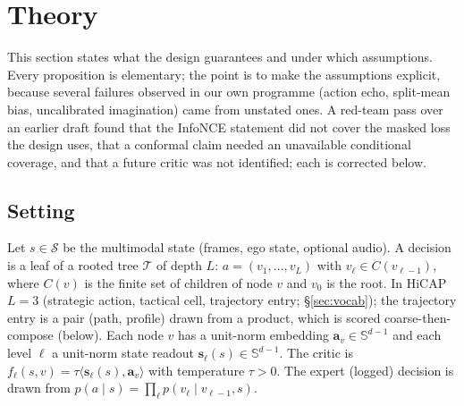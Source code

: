 \section{Theory}\label{sec:theory}
This section states what the design guarantees and under which assumptions. Every proposition is
elementary; the point is to make the assumptions explicit, because several failures observed in
our own programme (action echo, split-mean bias, uncalibrated imagination) came from unstated ones. A red-team pass over an earlier draft found
that the InfoNCE statement did not cover the masked loss the design uses, that a conformal claim needed an unavailable conditional coverage, and that a future critic was not identified; each is corrected below.

\subsection{Setting}
Let $s\in\mathcal S$ be the multimodal state (frames, ego state, optional audio). A decision is a leaf of a
rooted tree $\mathcal T$ of depth $L$: $a=(v_1,\dots,v_L)$ with $v_\ell\in C(v_{\ell-1})$, where $C(v)$ is the
finite set of children of node $v$ and $v_0$ is the root. In HiCAP $L=3$ (strategic action, tactical cell, trajectory entry;
\S\ref{sec:vocab}); the trajectory entry is a pair (path, profile) drawn from a product, which is scored coarse-then-compose (below). Each node $v$ has a unit-norm embedding $\mathbf a_v\in\mathbb S^{d-1}$
and each level $\ell$ a unit-norm state readout $\mathbf s_\ell(s)\in\mathbb S^{d-1}$. The critic is
$f_\ell(s,v)=\tau\langle\mathbf s_\ell(s),\mathbf a_v\rangle$ with temperature $\tau>0$.
The expert (logged) decision is drawn from $p(a\mid s)=\prod_{\ell}p(v_\ell\mid v_{\ell-1},s)$.

